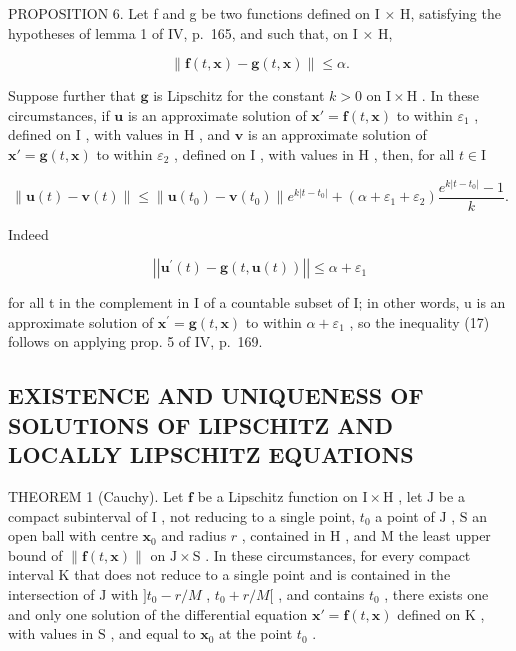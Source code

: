 PROPOSITION 6. Let f and g be two functions defined on I × H, satisfying the hypotheses of lemma 1 of IV, p.~165, and such that, on I × H,

\[
\left\| \mathbf {f} (t, \mathbf {x}) - \mathbf {g} (t, \mathbf {x}) \right\| \leqslant \alpha .\tag{16}
\]

Suppose further that \(\mathbf{g}\) is Lipschitz for the constant \(k > 0\) on \(\mathrm{I} \times \mathrm{H}\) . In these circumstances, if \(\mathbf{u}\) is an approximate solution of \(\mathbf{x}' = \mathbf{f}(t, \mathbf{x})\) to within \(\varepsilon_1\) , defined on \(\mathrm{I}\) , with values in \(\mathrm{H}\) , and \(\mathbf{v}\) is an approximate solution of \(\mathbf{x}' = \mathbf{g}(t, \mathbf{x})\) to within \(\varepsilon_2\) , defined on \(\mathrm{I}\) , with values in \(\mathrm{H}\) , then, for all \(t \in \mathrm{I}\)

\[
\| \mathbf {u} (t) - \mathbf {v} (t) \| \leqslant \| \mathbf {u} (t _ {0}) - \mathbf {v} (t _ {0}) \| e ^ {k | t - t _ {0} |} + (\alpha + \varepsilon_ {1} + \varepsilon_ {2}) \frac {e ^ {k | t - t _ {0} |} - 1}{k}.\tag{17}
\]

Indeed

\[
\left| \left| \mathbf {u} ^ {\prime} (t) - \mathbf {g} (t, \mathbf {u} (t)) \right| \right| \leqslant \alpha + \varepsilon_ {1}
\]

for all t in the complement in I of a countable subset of I; in other words, u is an approximate solution of \(\mathbf{x}^{\prime} = \mathbf{g}(t, \mathbf{x})\) to within \(\alpha + \varepsilon_{1}\) , so the inequality (17) follows on applying prop. 5 of IV, p.~169.

\subsection{EXISTENCE AND UNIQUENESS OF SOLUTIONS OF LIPSCHITZ AND LOCALLY LIPSCHITZ EQUATIONS}

THEOREM 1 (Cauchy). Let \(\mathbf{f}\) be a Lipschitz function on \(\mathrm{I} \times \mathrm{H}\) , let \(\mathrm{J}\) be a compact subinterval of \(\mathrm{I}\) , not reducing to a single point, \(t_0\) a point of \(\mathrm{J}\) , \(\mathrm{S}\) an open ball with centre \(\mathbf{x}_0\) and radius \(r\) , contained in \(\mathrm{H}\) , and \(\mathrm{M}\) the least upper bound of \(\| \mathbf{f}(t, \mathbf{x})\|\) on \(\mathrm{J} \times \mathrm{S}\) . In these circumstances, for every compact interval \(\mathrm{K}\) that does not reduce to a single point and is contained in the intersection of \(\mathrm{J}\) with \(]t_0 - r / M\) , \(t_0 + r / M[\) , and contains \(t_0\) , there exists one and only one solution of the differential equation \(\mathbf{x}' = \mathbf{f}(t, \mathbf{x})\) defined on \(\mathrm{K}\) , with values in \(\mathrm{S}\) , and equal to \(\mathbf{x}_0\) at the point \(t_0\) .

